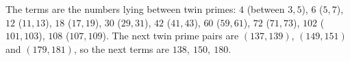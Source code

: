 The terms are the numbers lying between twin primes: $4$ (between $3,5$), $6$ ($5,7$), $12$ ($11,13$), $18$ ($17,19$), $30$ ($29,31$), $42$ ($41,43$), $60$ ($59,61$), $72$ ($71,73$), $102$ ($101,103$), $108$ ($107,109$). The next twin prime pairs are $(137,139)$, $(149,151)$ and $(179,181)$, so the next terms are $\boxed{138,\ 150,\ 180}$.
